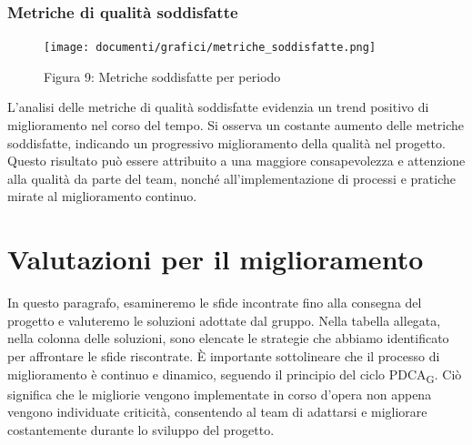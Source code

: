 \documentclass{article}
\begin{document}
\subsubsection{Metriche di qualità soddisfatte}
\begin{figure}[H]
    \centering
    \texttt{[image: documenti/grafici/metriche\_soddisfatte.png]}
    \caption{Figura 9: Metriche soddisfatte per periodo}
    \end{figure}
    L'analisi delle metriche di qualità soddisfatte evidenzia un trend positivo di miglioramento nel corso del tempo. Si osserva un costante aumento delle metriche soddisfatte, indicando un progressivo miglioramento della qualità nel progetto. Questo risultato può essere attribuito a una maggiore consapevolezza e attenzione alla qualità da parte del team, nonché all'implementazione di processi e pratiche mirate al miglioramento continuo.

\section{Valutazioni per il miglioramento}
In questo paragrafo, esamineremo le sfide incontrate fino alla consegna del progetto e valuteremo le soluzioni adottate dal gruppo. Nella tabella allegata, nella colonna delle soluzioni, sono elencate le strategie che abbiamo identificato per affrontare le sfide riscontrate. È importante sottolineare che il processo di miglioramento è continuo e dinamico, seguendo il principio del ciclo PDCA\textsubscript{G}. Ciò significa che le migliorie vengono implementate in corso d'opera non appena vengono individuate criticità, consentendo al team di adattarsi e migliorare costantemente durante lo sviluppo del progetto.
\end{document}
